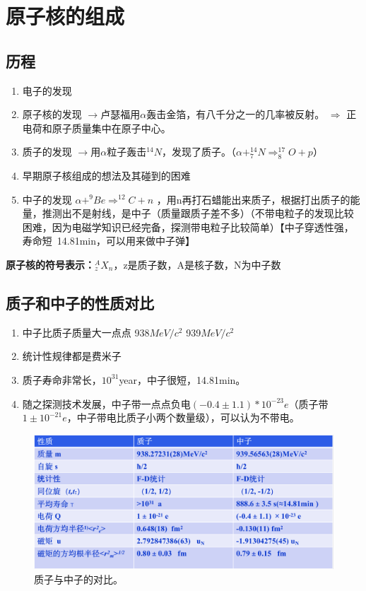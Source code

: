 \chapter{原子核的组成}

\section{历程} 

\begin{enumerate}
    \item 电子的发现 
    \item 原子核的发现 $\rightarrow$卢瑟福用$\alpha$轰击金箔，有八千分之一的几率被反射。 $\Rightarrow$ 正电荷和原子质量集中在原子中心。
    \item 质子的发现 $\rightarrow$用$\alpha$粒子轰击$^{14}N$，发现了质子。（$\alpha +  ^{14}_{7}N \Rightarrow  ^{17}_{8}O + p$）
    \item 早期原子核组成的想法及其碰到的困难
    \item 中子的发现 $\alpha + ^{9}Be \Rightarrow ^{12}C + n$  ，用n再打石蜡能出来质子，根据打出质子的能量，推测出不是射线，是中子（质量跟质子差不多）（不带电粒子的发现比较困难，因为电磁学知识已经完备，探测带电粒子比较简单）【中子穿透性强，寿命短~14.81min，可以用来做中子弹】
\end{enumerate}

\vspace{1.2em}

\textbf{原子核的符号表示：}$_{z}^{A}X_{n}$，z是质子数，A是核子数，N为中子数

\section{质子和中子的性质对比} 

\begin{enumerate}
    \item 中子比质子质量大一点点  938$MeV/c^2$  939$MeV/c^2$
    \item 统计性规律都是费米子
    \item 质子寿命非常长，$10^{31}$year，中子很短，14.81min。
    \item 随之探测技术发展，中子带一点点负电$(-0.4\pm 1.1)*10^{-23}e$（质子带$1\pm10^{-21}e$，中子带电比质子小两个数量级），可以认为不带电。
\end{enumerate}

\begin{figure}[htbp]
    \centering
    \includegraphics[width=14cm]{figure//fig001.png}
    \caption{\label{fig001}质子与中子的对比。}
\end{figure}

